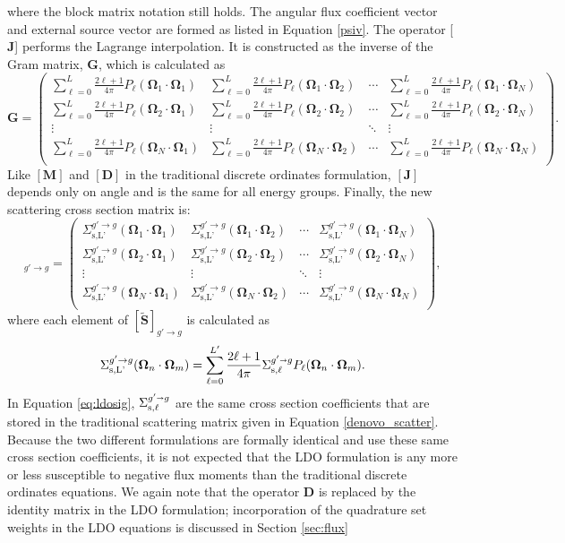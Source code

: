 \documentclass{article} %
\newcommand{\sa}{\shortrightarrow}
\newcommand{\bo}{\mathbf\Omega}
\newcommand{\ve}[1]{\ensuremath{\mathbf{#1}}}
\newcommand{\Sigg}[1]{\ensuremath{\Sigma^{g'\sa g}_{\text{s},#1}}}
\newcommand{\Gij}[2]{\sum_{\ell=0}^L\frac{2\ell+1}{4\pi}P_{\ell}(\bo_#1\cdot\bo_#2)}
\newcommand{\Sij}[2]{\Sigma^{g'\rightarrow g}_{\text{s,L'}}(\bo_#1\cdot\bo_#2)}
\begin{document}
%
where the block matrix notation still holds. The angular flux
coefficient vector and external source vector are formed as listed in Equation
\eqref{psiv}. The operator [$\ve{J}$] performs the Lagrange interpolation. It is
constructed as the inverse of the Gram matrix, $\ve{G}$, which is calculated as
%
\begin{equation}
  \ve{G} = \begin{pmatrix}
    \Gij{1}{1} & \Gij{1}{2} & \cdots & \Gij{1}{N} \\
    \Gij{2}{1} & \Gij{2}{2} & \cdots & \Gij{2}{N} \\
    \vdots     & \vdots     & \ddots & \vdots     \\
    \Gij{N}{1} & \Gij{N}{2} & \cdots & \Gij{N}{N} \\
  \end{pmatrix}.
\label{gram}
\end{equation}
%
Like $[\ve{M}]$ and $[\ve{D}]$ in the traditional discrete ordinates
formulation, $[\ve{J}]$ depends only on angle and is the same for all 
energy groups. Finally, the new scattering cross section matrix is:
%
\begin{equation}
  [\ve{\tilde{S}}]_{g'\rightarrow g} = \begin{pmatrix}
    \Sij{1}{1} & \Sij{1}{2} & \cdots & \Sij{1}{N} \\
    \Sij{2}{1} & \Sij{2}{2} & \cdots & \Sij{2}{N} \\
    \vdots     & \vdots     & \ddots & \vdots     \\
    \Sij{N}{1} & \Sij{N}{2} & \cdots & \Sij{N}{N} \\
  \end{pmatrix},
\label{ldo_scatter}
\end{equation}
%
where each element of $[\ve{\tilde{S}}]_{g'\rightarrow g}$ is
calculated as
%
\begin{equation}
\Sij{n}{m} = \sum_{\ell=0}^{L'} \frac{2\ell +1}{4\pi}\Sigg{\ell}
P_{\ell}(\bo_n \cdot\bo_m).
\label{eq:ldosig}
\end{equation}
%
In Equation \eqref{eq:ldosig}, $\Sigg{\ell}$ are the same cross section
coefficients that are stored in the traditional scattering matrix given in
Equation \eqref{denovo_scatter}. Because the two different formulations are
formally identical and use these same cross section coefficients, it is not
expected that the LDO formulation is any more or less susceptible to negative
flux moments than the traditional discrete ordinates equations. We again note
that the operator $\ve{D}$ is replaced by the identity matrix in the LDO
formulation; incorporation of the quadrature set weights in the LDO equations
is discussed in Section \ref{sec:flux}\
\end{document}

